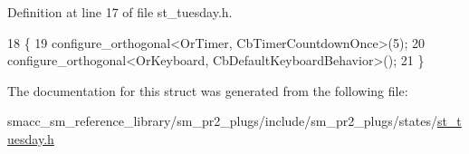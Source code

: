 Definition at line 17 of file st\+\_\+tuesday.\+h.


\begin{DoxyCode}
18     \{
19         configure\_orthogonal<OrTimer, CbTimerCountdownOnce>(5);   
20         configure\_orthogonal<OrKeyboard, CbDefaultKeyboardBehavior>();
21     \}
\end{DoxyCode}


The documentation for this struct was generated from the following file\+:\begin{DoxyCompactItemize}
\item 
smacc\+\_\+sm\+\_\+reference\+\_\+library/sm\+\_\+pr2\+\_\+plugs/include/sm\+\_\+pr2\+\_\+plugs/states/\hyperlink{sm__pr2__plugs_2include_2sm__pr2__plugs_2states_2st__tuesday_8h}{st\+\_\+tuesday.\+h}\end{DoxyCompactItemize}
